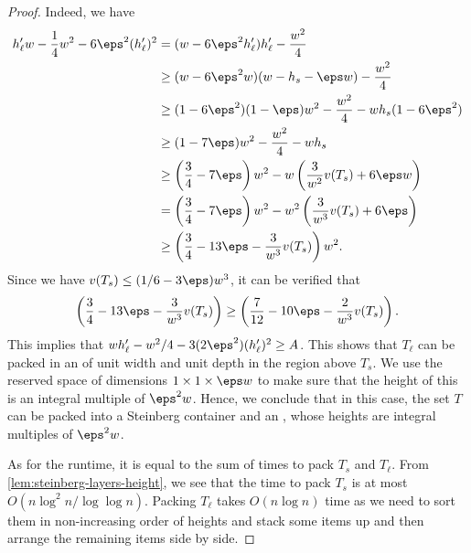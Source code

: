\begin{proof}
Indeed, we have
\begin{align*}
    h'_{\ell}w-\frac14w^2-6\eps^2(h_{\ell}')^2 &= (w-6\eps^2h_{\ell}')h_{\ell}'-\frac{w^2}{4}\\
    &\ge (w-6\eps^2w)(w-h_s-\eps w)-\frac{w^2}{4}\\
    &\ge (1-6\eps^2)(1-\eps)w^2-\frac{w^2}{4}-w h_s(1-6\eps^2)\\
    &\ge (1-7\eps)w^2-\frac{w^2}{4}-wh_s\\
    &\ge \left(\frac34-7\eps\right)w^2-w\left(\frac{3}{w^2}v(T_s)+6\eps w\right)\\
    &= \left(\frac34-7\eps\right)w^2-w^2\left(\frac{3}{w^3}v(T_s)+6\eps\right)\\
    &\ge \left(\frac34-13\eps-\frac{3}{w^3}v(T_s)\right)w^2.
\end{align*}
Since we have $v(T_s)\le (1/6-3\eps)w^3$, it can be verified that 
\begin{align*}
\left(\frac34-13\eps-\frac{3}{w^3}v(T_s)\right)\ge \left(\frac{7}{12}-10\eps-\frac{2}{w^3}v(T_s)\right).
\end{align*}
This implies that $wh'_{\ell}-w^2/4-3(2\eps^2)(h'_{\ell})^2\ge A$.
This shows that $T_\ell$ can be packed in an \LContainer{} of unit width and unit depth in the region above $T_s$. We use the reserved space of dimensions $1\times1\times\eps w$
to make sure that the height of this \LContainer{} is an integral multiple of $\eps^2 w$. Hence, we conclude that in this case, the set $T$ can be packed into a Steinberg container
and an \LContainer{}, whose heights are integral multiples of $\eps^2 w$.

As for the runtime, it is equal to the sum of times to pack $T_s$ and $T_\ell$. From \cref{lem:steinberg-layers-height}, we see that the time to pack $T_s$ is at most
$O(n\log^2 n/\log \log n)$. Packing $T_\ell$ takes $O(n\log n)$ time as we need to sort them in non-increasing order of heights and stack some items up and then arrange the remaining items side by side.
\end{proof}

